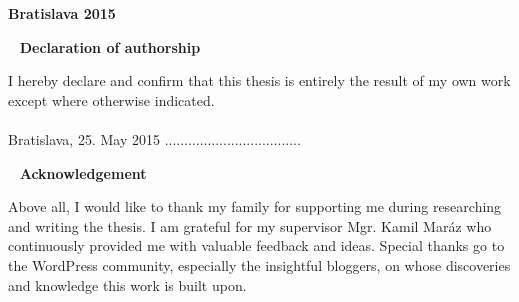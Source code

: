 \vfill
\noindent
{\bf Bratislava 2015}  \hfill {\bf \autor}
\thispagestyle{empty}


\newpage
{~}\vfill
{\noindent \large\bf Declaration of authorship} 
\vspace{1.5cm}

I hereby declare and confirm that this thesis is entirely the result of my own work except
where otherwise indicated.\\\\ 
Bratislava, 25. May 2015
\hfill ................................... 
\vspace{1cm}

\newpage
{~}\vfill
{\noindent\large\bf Acknowledgement} 
\vspace{1.5cm}

Above all, I would like to thank my family for supporting me during researching and writing the thesis. I am grateful for my supervisor Mgr. Kamil Maráz who continuously provided me with valuable feedback and ideas. Special thanks go to the WordPress community, especially the insightful bloggers, on whose discoveries and knowledge this work is built upon. \\
\vspace{1cm}

\newpage

